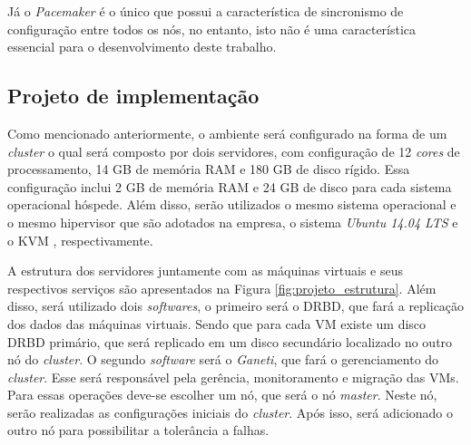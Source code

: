 Já o \textit{Pacemaker} é o único que possui a característica de sincronismo de configuração entre todos os nós, no entanto, isto não é uma
característica essencial para o desenvolvimento deste trabalho.


\subsection{Projeto de implementação}
\label{section:projetoimpl}

Como mencionado anteriormente, o ambiente será configurado na forma de um \textit{cluster} o qual será composto por dois servidores, 
com configuração de 12 \textit{cores} de processamento, 14 GB de memória \ac{RAM} e 180 GB de disco rígido. Essa configuração inclui
2 GB de memória \ac{RAM} e 24 GB de disco para cada sistema operacional hóspede. Além disso, serão utilizados o mesmo sistema operacional e o 
mesmo hipervisor que são adotados na empresa, o sistema \textit{Ubuntu 14.04 \ac{LTS}} e o \ac{KVM} \cite{kvm}, respectivamente.

A estrutura dos servidores juntamente com as máquinas virtuais e seus respectivos serviços são apresentados na Figura \ref{fig:projeto_estrutura}. 
Além disso, será utilizado dois \textit{softwares}, o primeiro será o \ac{DRBD}, que fará a replicação dos dados das máquinas virtuais. 
Sendo que para cada \ac{VM} existe um disco \ac{DRBD} primário, que será replicado em um disco secundário localizado no outro nó do \textit{cluster}. 
O segundo \textit{software} será o \textit{Ganeti}, que fará o gerenciamento do \textit{cluster}.
Esse será responsável pela gerência, monitoramento e migração das \acp{VM}. Para essas operações deve-se escolher um nó, que será o nó 
\textit{master}. Neste nó, serão realizadas as configurações iniciais do \textit{cluster}.
Após isso, será adicionado o outro nó para possibilitar a tolerância a falhas. 

